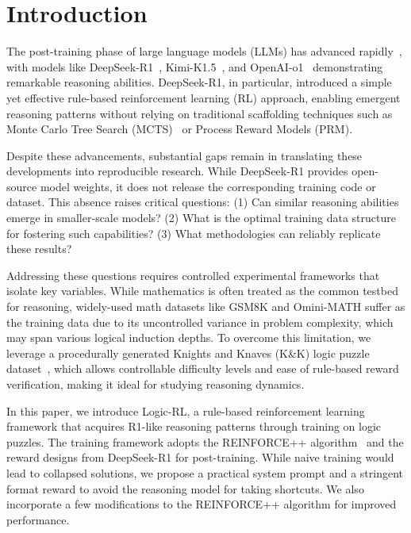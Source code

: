 
\section{Introduction}

The post-training phase of large language models (LLMs) has advanced rapidly~\cite{xu2025largereasoningmodelssurvey}, with models like DeepSeek-R1~\cite{deepseekai2025deepseekr1incentivizingreasoningcapability}, Kimi-K1.5~\cite{kimiteam2025kimik15scalingreinforcement}, and OpenAI-o1~\cite{o1} demonstrating remarkable reasoning abilities. DeepSeek-R1, in particular, introduced a simple yet effective rule-based reinforcement learning (RL) approach, enabling emergent reasoning patterns without relying on traditional scaffolding techniques such as Monte Carlo Tree Search (MCTS)~\cite{sc-mcts, deepprover1.5, xu2023traingainunleashmathematical, feng2024alphazeroliketreesearchguidelarge} or Process Reward Models (PRM)\cite{lightman2023letsverifystepstep}.

Despite these advancements, substantial gaps remain in translating these developments into reproducible research. While DeepSeek-R1 provides open-source model weights, it does not release the corresponding training code or dataset. This absence raises critical questions: (1) Can similar reasoning abilities emerge in smaller-scale models? (2) What is the optimal training data structure for fostering such capabilities? (3) What methodologies can reliably replicate these results?

Addressing these questions requires controlled experimental frameworks that isolate key variables.
While mathematics is often treated as the common testbed for reasoning, widely-used math datasets like GSM8K\cite{cobbe2021trainingverifierssolvemath} and Omini-MATH \cite{gao2024omnimathuniversalolympiadlevel} suffer as the training data due to its uncontrolled variance in problem complexity, which may span various logical induction depths. 
To overcome this limitation, we leverage a procedurally generated Knights and Knaves (K\&K) logic puzzle dataset~\cite{memllm}, which allows  controllable difficulty levels and ease of rule-based reward verification,  making it ideal for studying reasoning dynamics.


In this paper, we introduce Logic-RL, a rule-based reinforcement learning framework that acquires
R1-like reasoning patterns through training on logic puzzles.
The training framework adopts the REINFORCE++ algorithm~\cite{rpp} and the reward designs from DeepSeek-R1 for post-training.
While naive training would lead to collapsed solutions, we propose a practical system prompt and a stringent format reward to avoid the reasoning model for taking shortcuts.
We also incorporate a few modifications to the REINFORCE++ algorithm for improved performance. 



